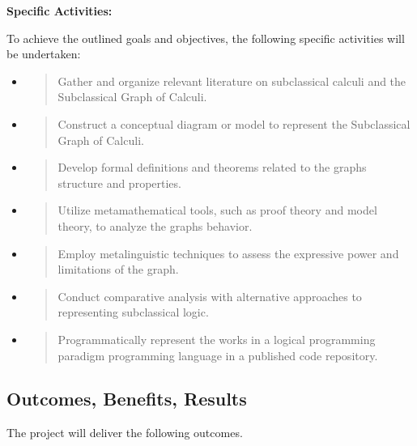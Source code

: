 \textbf{Specific Activities:}

To achieve the outlined goals and objectives, the following specific
activities will be undertaken:

\begin{itemize}
\item
  \begin{quote}
  Gather and organize relevant literature on subclassical calculi and
  the Subclassical Graph of Calculi.
  \end{quote}
\item
  \begin{quote}
  Construct a conceptual diagram or model to represent the Subclassical
  Graph of Calculi.
  \end{quote}
\item
  \begin{quote}
  Develop formal definitions and theorems related to the
  graph\textquotesingle s structure and properties.
  \end{quote}
\item
  \begin{quote}
  Utilize metamathematical tools, such as proof theory and model theory,
  to analyze the graph\textquotesingle s behavior.
  \end{quote}
\item
  \begin{quote}
  Employ metalinguistic techniques to assess the expressive power and
  limitations of the graph.
  \end{quote}
\item
  \begin{quote}
  Conduct comparative analysis with alternative approaches to
  representing subclassical logic.
  \end{quote}
\item
  \begin{quote}
  Programmatically represent the works in a logical programming paradigm
  programming language in a published code repository.
  \end{quote}
\end{itemize}

\hypertarget{outcomes-benefits-results}{%
\subsection{Outcomes, Benefits,
Results}\label{outcomes-benefits-results}}

The project will deliver the following outcomes.

